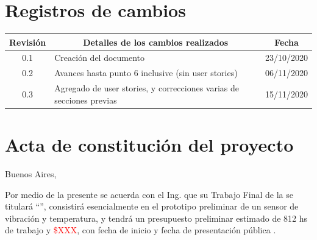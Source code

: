 \documentclass[11pt]{charter}
\begin{document}
\maketitle
\thispagestyle{empty}
\pagebreak


\thispagestyle{empty}
{\setlength{\parskip}{0pt}
\tableofcontents{}
}
\pagebreak


\section{Registros de cambios}
\label{sec:registro}


\begin{table}[ht]
\label{tab:registro}
\centering
\begin{tabularx}{\linewidth}{@{}|c|X|c|@{}}
\hline
\rowcolor[HTML]{C0C0C0} 
Revisión & \multicolumn{1}{c|}{\cellcolor[HTML]{C0C0C0}Detalles de los cambios realizados} & Fecha      \\ \hline
0.1      & Creación del documento                                          & 23/10/2020 \\ \hline
0.2      & Avances hasta punto 6 inclusive (sin user stories)                                         & 06/11/2020 \\ \hline
0.3      & Agregado de user stories, y correcciones varias de secciones previas                                         & 15/11/2020 \\ \hline
\end{tabularx}
\end{table}

\pagebreak



\section{Acta de constitución del proyecto}
\label{sec:acta}

\begin{flushright}
Buenos Aires, \fechaInicioName
\end{flushright}

\vspace{2cm}

Por medio de la presente se acuerda con el Ing. \authorname\hspace{1px} que su Trabajo Final de la \degreename\hspace{1px} se titulará ``\ttitle'', consistirá esencialmente en el prototipo preliminar de un sensor de vibración y temperatura, y tendrá un presupuesto preliminar estimado de 812 hs de trabajo y \textcolor{red}{\$XXX}, con fecha de inicio \fechaInicioName\hspace{1px} y fecha de presentación pública \fechaFinalName.
\end{document}
